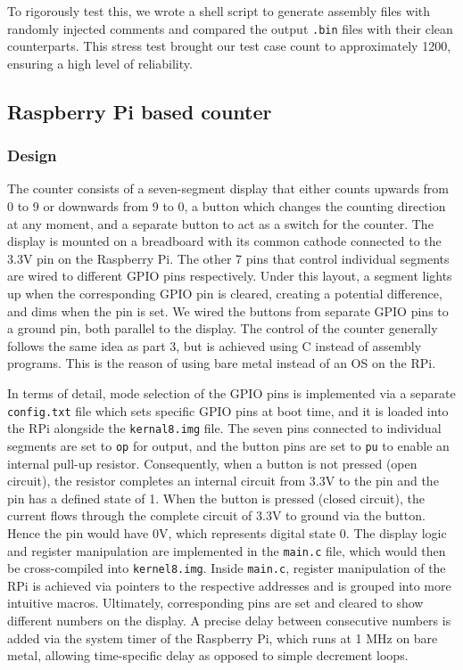 \documentclass[9pt,a4paper]{article}
\begin{document}
To rigorously test this, we wrote a shell script to generate assembly files with randomly injected comments and compared the output \verb|.bin| files with their clean counterparts.
This stress test brought our test case count to approximately 1200, ensuring a high level of reliability.

\subsection{Raspberry Pi based counter}

\subsubsection{Design}

The counter consists of a seven-segment display that either counts upwards from 0 to 9 or downwards from 9 to 0, a button which changes the counting direction at any moment, and a separate button to act as a switch for the counter.
The display is mounted on a breadboard with its common cathode connected to the 3.3V pin on the Raspberry Pi.
The other 7 pins that control individual segments are wired to different GPIO pins respectively.
Under this layout, a segment lights up when the corresponding GPIO pin is cleared, creating a potential difference, and dims when the pin is set.
We wired the buttons from separate GPIO pins to a ground pin, both parallel to the display.
The control of the counter generally follows the same idea as part 3, but is achieved using C instead of assembly programs.
This is the reason of using bare metal instead of an OS on the RPi.

In terms of detail, mode selection of the GPIO pins is implemented via a separate \verb|config.txt| file which sets specific GPIO pins at boot time, and it is loaded into the RPi alongside the \verb|kernal8.img| file.
The seven pins connected to individual segments are set to \verb|op| for output, and the button pins are set to \verb|pu| to enable an internal pull-up resistor.
Consequently, when a button is not pressed (open circuit), the resistor completes an internal circuit from 3.3V to the pin and the pin has a defined state of 1.
When the button is pressed (closed circuit), the current flows through the complete circuit of 3.3V to ground via the button. Hence the pin would have 0V, which represents digital state 0.
The display logic and register manipulation are implemented in the \verb|main.c| file, which would then be cross-compiled into \verb|kernel8.img|.
Inside \verb|main.c|, register manipulation of the RPi is achieved via pointers to the respective addresses and is grouped into more intuitive macros.
Ultimately, corresponding pins are set and cleared to show different numbers on the display.
A precise delay between consecutive numbers is added via the system timer of the Raspberry Pi, which runs at 1 MHz on bare metal, allowing time-specific delay as opposed to simple decrement loops.
\end{document}
